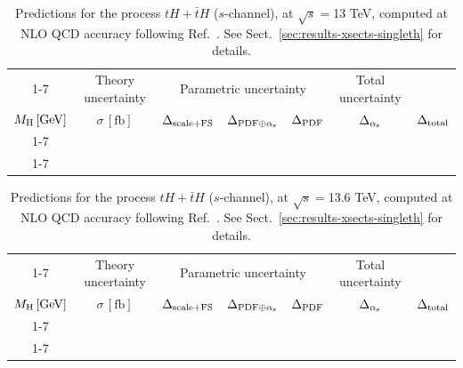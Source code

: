 \begin{table}[ht!]
\caption{\label{tab:th-s-tot13} Predictions for the process $tH + \bar t H$ ($s$-channel), at $\sqrt{s}=$13 TeV, computed at NLO QCD accuracy following Ref.~\cite{Demartin:2015uha}. See Sect.~\ref{sec:results-xsects-singleth} for details.}
\centering
\scriptsize
{\renewcommand{\arraystretch}{1.4}
\begin{tabular}{| cc | c | ccc | c |}
\cline{1-7}
\multicolumn{2}{|c|}{\(\sqrt{s} = 13\,\mathrm{TeV}\)} &
\multicolumn{1}{|c|}{Theory uncertainty} &
\multicolumn{3}{|c|}{Parametric uncertainty} &
\multicolumn{1}{c|}{Total uncertainty} \\
\(M_\mathrm{H}\,[\mathrm{GeV}]\) & \(\sigma\,[\mathrm{fb}]\) &
\(\Delta_{\rm scale+\textrm{FS}}\) &
\(\Delta_{{\rm PDF}\oplus\alpha_{\mathrm{s}}}\) &
{\color{black!55}\(\Delta_{\rm PDF}\)} & {\color{black!55}\(\Delta_{\alpha_{\mathrm{s}}}\)} &
\(\Delta_{\rm total}\)
\\
\cline{1-7}
 \\
\cline{1-7}
\end{tabular}
}
\end{table}

\begin{table}[ht!]
\caption{\label{tab:th-s-tot136} Predictions for the process $tH + \bar t H$ ($s$-channel), at $\sqrt{s}=$13.6 TeV, computed at NLO QCD accuracy following Ref.~\cite{Demartin:2015uha}. See Sect.~\ref{sec:results-xsects-singleth} for details.}
\centering
\scriptsize
{\renewcommand{\arraystretch}{1.4}
\begin{tabular}{| cc | c | ccc | c |}
\cline{1-7}
\multicolumn{2}{|c|}{\(\sqrt{s} = 13.6\,\mathrm{TeV}\)} &
\multicolumn{1}{|c|}{Theory uncertainty} &
\multicolumn{3}{|c|}{Parametric uncertainty} &
\multicolumn{1}{c|}{Total uncertainty} \\
\(M_\mathrm{H}\,[\mathrm{GeV}]\) & \(\sigma\,[\mathrm{fb}]\) &
\(\Delta_{\rm scale+\textrm{FS}}\) &
\(\Delta_{{\rm PDF}\oplus\alpha_{\mathrm{s}}}\) &
{\color{black!55}\(\Delta_{\rm PDF}\)} & {\color{black!55}\(\Delta_{\alpha_{\mathrm{s}}}\)} &
\(\Delta_{\rm total}\)
\\
\cline{1-7}
 \\
\cline{1-7}
\end{tabular}
}
\end{table}

